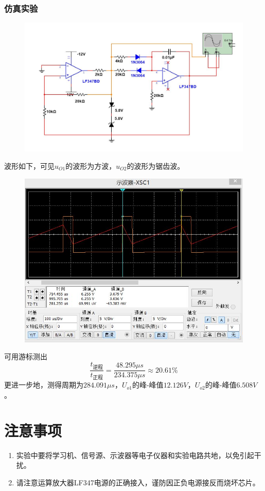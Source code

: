 \documentclass[12pt,a4paper]{article}
\begin{document}
\begin{spacing}{1.3}
\subsubsection{仿真实验}
\begin{figure}[H]
\centering
\includegraphics[width=\textwidth]{10-.jpg}
\end{figure}
波形如下，可见$u_{O1}$的波形为方波，$u_{O2}$的波形为锯齿波。
\begin{figure}[H]
\centering
\includegraphics[width=\textwidth]{11-.jpg}
\end{figure}
可用游标测出
\[\frac{t_{逆程}}{t_{正程}} = \frac{48.295\mu s}{234.375\mu s} \approx 20.61\%\]
更进一步地，测得周期为$284.091\mu s$，$U_{o1}$的峰-峰值$12.126V$，$U_{o2}$的峰-峰值$6.508V$。
\section{注意事项}
\begin{enumerate}
\item 实验中要将学习机、信号源、示波器等电子仪器和实验电路共地，以免引起干扰。 
\item 请注意运算放大器LF347电源的正确接入，谨防因正负电源接反而烧坏芯片。
\end{enumerate}

\end{spacing}
\end{document}
